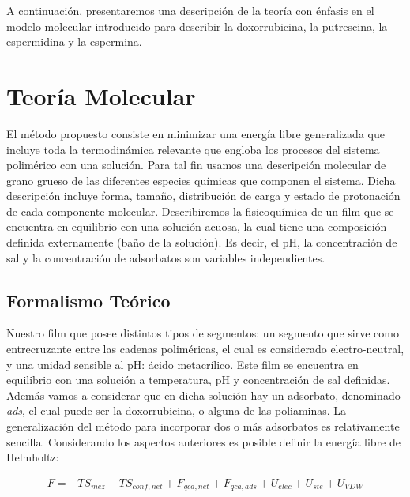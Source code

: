 A continuaci\'on, presentaremos una descripci\'on de la teor\'ia con \'enfasis en el modelo molecular introducido para describir la doxorrubicina, la putrescina, la espermidina y la espermina.


\section{Teor\'ia Molecular } \label{sec:film-teoria}

El m\'etodo propuesto consiste en minimizar una energ\'ia libre generalizada que incluye toda la termodin\'amica relevante que engloba los procesos del sistema polim\'erico con una soluci\'on. Para tal fin  usamos  una descripci\'on molecular de grano grueso de las diferentes especies qu\'imicas que componen el sistema.
Dicha descripci\'on incluye forma, tama\~no, distribuci\'on de carga  y estado de protonaci\'on de cada componente molecular.
Describiremos la fisicoqu\'imica de un film  que  se encuentra en  equilibrio con una soluci\'on acuosa, la cual  tiene una composici\'on  definida externamente (ba\~no de la soluci\'on).
Es decir, el pH, la concentraci\'on de sal y la concentraci\'on de adsorbatos son variables independientes.

\subsection{Formalismo Te\'orico}
Nuestro film que posee distintos tipos de segmentos: un segmento que sirve como entrecruzante entre las cadenas polim\'ericas, el cual es considerado electro-neutral, y  una unidad sensible al pH:  \'acido metacr\'ilico.
Este film  se encuentra en equilibrio con una soluci\'on a temperatura, pH y concentraci\'on de sal definidas. Adem\'as vamos a considerar que en dicha soluci\'on hay un adsorbato, denominado \textit{ads}, el cual puede ser la doxorrubicina, o alguna de las poliaminas.
La generalizaci\'on del m\'etodo para incorporar dos o m\'as adsorbatos es relativamente sencilla.
Considerando los aspectos anteriores es posible definir la energ\'ia libre de Helmholtz:

\begin{align}
 	F = -TS_{mez} -TS_{conf,net} + F_{qca,net} + F_{qca,ads} + U_{elec} + U_{ste} + U_{VDW}
 	\label{eq:film:libre-film}
\end{align}
 
